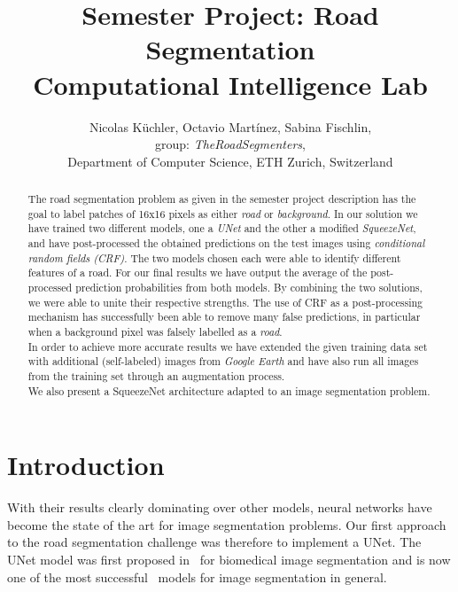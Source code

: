 \documentclass[10pt,conference,compsocconf]{IEEEtran}
\begin{document}
\title{
  Semester Project: Road Segmentation\\
  \large Computational Intelligence Lab\\
}

\author{
  Nicolas K{\"u}chler, Octavio Mart{\'i}nez, Sabina Fischlin,\\
  group: \textit{TheRoadSegmenters},\\
  Department of Computer Science, ETH Zurich, Switzerland
}

\maketitle

\begin{abstract}
The road segmentation problem as given in the semester project description has the goal to label patches of 16x16 pixels as either \textit{road} or \textit{background}. In our solution we have trained two different models, one a \textit{UNet} and the other a modified  \textit{SqueezeNet}, and have post-processed the obtained predictions on the test images using  \textit{conditional random fields (CRF)}. The two models chosen each were able to identify different features of a road. For our final results we have output the average of the post-processed prediction probabilities from both models. By combining the two solutions, we were able to unite their respective strengths. The use of CRF as a post-processing mechanism has successfully been able to remove many false predictions, in particular when a background pixel was falsely labelled as a \textit{road}.  \\
In order to achieve more accurate results we have extended the given training data set with additional (self-labeled) images from \textit{Google Earth} and have also run all images from the training set through an augmentation process.\\
We also present a SqueezeNet architecture adapted to an image segmentation problem.
\end{abstract}

\section{Introduction}
With their results clearly dominating over other models, neural networks have become the state of the art for image segmentation problems. Our first approach to the road segmentation challenge was therefore to implement a UNet. The UNet model was first proposed in~\cite{RFB15a} for biomedical image segmentation and is now one of the most successful~\cite{IEEE1} models for image segmentation in general.
\end{document}
